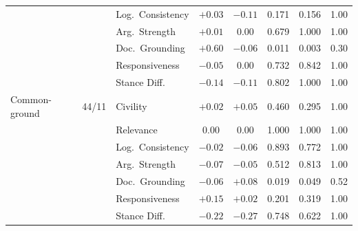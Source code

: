 \begin{table}[htbp]
\begin{tabular}{l c l cc ccc}
 &  & Log.\ Consistency & $+0.03$ & $-0.11$ & 0.171 & 0.156 & 1.00 \\
 &  & Arg.\ Strength & $+0.01$ & $0.00$ & 0.679 & 1.000 & 1.00 \\
 &  & Doc.\ Grounding & $+0.60$ & $-0.06$ & 0.011 & 0.003 & 0.30 \\
 &  & Responsiveness & $-0.05$ & $0.00$ & 0.732 & 0.842 & 1.00 \\
 &  & Stance Diff. & $-0.14$ & $-0.11$ & 0.802 & 1.000 & 1.00 \\
\midrule
Common-ground & 44/11 & Civility & $+0.02$ & $+0.05$ & 0.460 & 0.295 & 1.00 \\
 &  & Relevance & $0.00$ & $0.00$ & 1.000 & 1.000 & 1.00 \\
 &  & Log.\ Consistency & $-0.02$ & $-0.06$ & 0.893 & 0.772 & 1.00 \\
 &  & Arg.\ Strength & $-0.07$ & $-0.05$ & 0.512 & 0.813 & 1.00 \\
 &  & Doc.\ Grounding & $-0.06$ & $+0.08$ & 0.019 & 0.049 & 0.52 \\
 &  & Responsiveness & $+0.15$ & $+0.02$ & 0.201 & 0.319 & 1.00 \\
 &  & Stance Diff. & $-0.22$ & $-0.27$ & 0.748 & 0.622 & 1.00 \\
\bottomrule
\end{tabular}
\end{table}